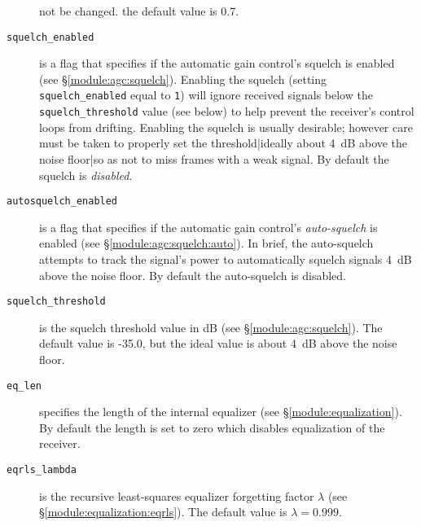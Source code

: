 \begin{description}
    not be changed.
    the default value is 0.7.
\item[{\tt squelch\_enabled}]
    is a flag that specifies if the automatic gain control's squelch is
    enabled (see \S\ref{module:agc:squelch}).
    Enabling the squelch
    (setting {\tt squelch\_enabled} equal to {\tt 1})
    will ignore received signals below the {\tt squelch\_threshold}
    value (see below) to help prevent the receiver's control loops from
    drifting.
    Enabling the squelch is usually desirable;
    however care must be taken to properly set the threshold|ideally
    about 4~dB above the noise floor|so as not to miss frames with a
    weak signal.
    By default the squelch is {\em disabled}.
\item[{\tt autosquelch\_enabled}]
    is a flag that specifies if the automatic gain control's
    {\em auto-squelch} is enabled (see
    \S\ref{module:agc:squelch:auto}).
    In brief, the auto-squelch attempts to track the signal's power to
    automatically squelch signals 4~dB above the noise floor.
    By default the auto-squelch is disabled.
\item[{\tt squelch\_threshold}]
    is the squelch threshold value in dB
    (see \S\ref{module:agc:squelch}).
    The default value is -35.0, but the ideal value is about 4~dB above
    the noise floor.
\item[{\tt eq\_len}]
    specifies the length of the internal equalizer
    (see \S\ref{module:equalization}).
    By default the length is set to zero which disables equalization of
    the receiver.
\item[{\tt eqrls\_lambda}]
    is the recursive least-squares equalizer forgetting factor
    $\lambda$
    (see \S\ref{module:equalization:eqrls}).
    The default value is $\lambda=0.999$.
\end{description}


